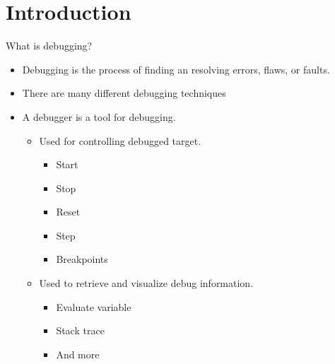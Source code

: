 \section{Introduction}

\begin{frame}{What is debugging?}
	\begin{itemize}
		\item Debugging is the process of finding an resolving errors, flaws, or faults.
		\item There are many different debugging techniques
		\item A debugger is a tool for debugging.
			\begin{itemize}
				\item Used for controlling debugged target.
			    \begin{itemize}
            \item Start
            \item Stop
            \item Reset
            \item Step
            \item Breakpoints
          \end{itemize}
				\item Used to retrieve and visualize debug information.
			    \begin{itemize}
            \item Evaluate variable
            \item Stack trace
            \item And more
          \end{itemize}
      \end{itemize}
	\end{itemize}
\end{frame}


